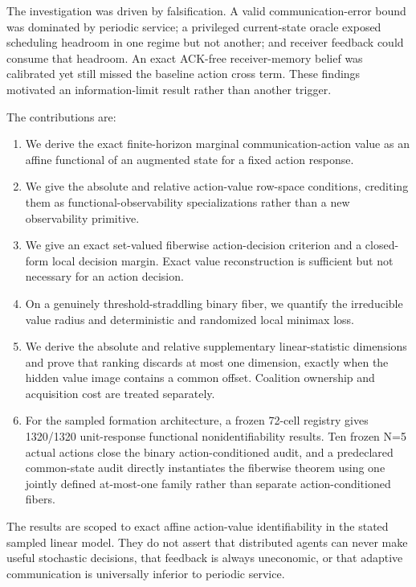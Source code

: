 \documentclass[10pt,twocolumn,twoside]{IEEEtran}
\begin{document}
The investigation was driven by falsification.  A valid communication-error
bound was dominated by periodic service; a privileged current-state oracle
exposed scheduling headroom in one regime but not another; and receiver
feedback could consume that headroom.  An exact ACK-free receiver-memory
belief was calibrated yet still missed the baseline action cross term.  These
findings motivated an information-limit result rather than another trigger.

The contributions are:

\begin{enumerate}
\item We derive the exact finite-horizon marginal communication-action value
as an affine functional of an augmented state for a fixed action response.
\item We give the absolute and relative action-value row-space conditions,
crediting them as functional-observability specializations rather than a new
observability primitive.
\item We give an exact set-valued fiberwise action-decision criterion and a
closed-form local decision margin.  Exact value reconstruction is sufficient
but not necessary for an action decision.
\item On a genuinely threshold-straddling binary fiber, we quantify the
irreducible value radius and deterministic and randomized local minimax loss.
\item We derive the absolute and relative supplementary linear-statistic
dimensions and prove that ranking discards at most one dimension, exactly when
the hidden value image contains a common offset.  Coalition ownership and
acquisition cost are treated separately.
\item For the sampled formation architecture, a frozen 72-cell registry gives
1320/1320 unit-response functional nonidentifiability results.  Ten frozen N=5
actual actions close the binary action-conditioned audit, and a predeclared
common-state audit directly instantiates the fiberwise theorem using one
jointly defined at-most-one family rather than separate action-conditioned
fibers.
\end{enumerate}

The results are scoped to exact affine action-value identifiability in the
stated sampled linear model.  They do not assert that distributed agents can
never make useful stochastic decisions, that feedback is always uneconomic,
or that adaptive communication is universally inferior to periodic service.
\end{document}
